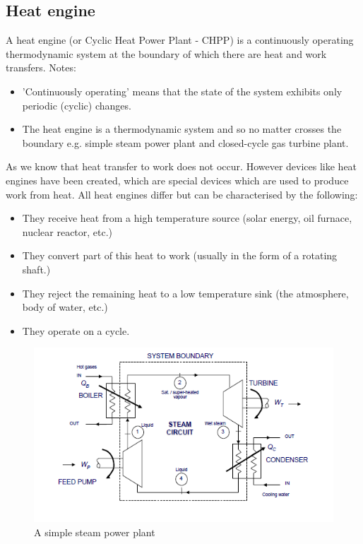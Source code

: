 \documentclass[class=report, crop=false, 12pt,a4paper]{standalone}
\begin{document}
\subsection{Heat engine}
A heat engine (or Cyclic Heat Power Plant - CHPP) is a continuously operating thermodynamic system at the boundary of which there are heat and work transfers.
Notes:
\begin{itemize}[noitemsep]
  \item 'Continuously operating' means that the state of the system exhibits only periodic (cyclic) changes.
  \item The heat engine is a thermodynamic system and so no matter crosses the boundary e.g. simple steam power plant and closed-cycle gas turbine plant.
\end{itemize}
As we know that heat transfer to work does not occur. However devices like heat engines have been created, which are special devices which are used to produce work from heat. All heat engines differ but can be characterised by the following: 
\begin{itemize}[noitemsep]
  \item They receive heat from a high temperature source (solar energy, oil furnace, nuclear reactor, etc.)
  \item They convert part of this heat to work (usually in the form of a rotating shaft.)
  \item They reject the remaining heat to a low temperature sink (the atmosphere, body of water, etc.)
  \item They operate on a cycle.
\end{itemize}
\begin{figure}[H]
  \centering
    \includegraphics[width = \textwidth]{../img/SimpleSteamPP}
    \caption{A simple steam power plant}
\end{figure}
\end{document}
